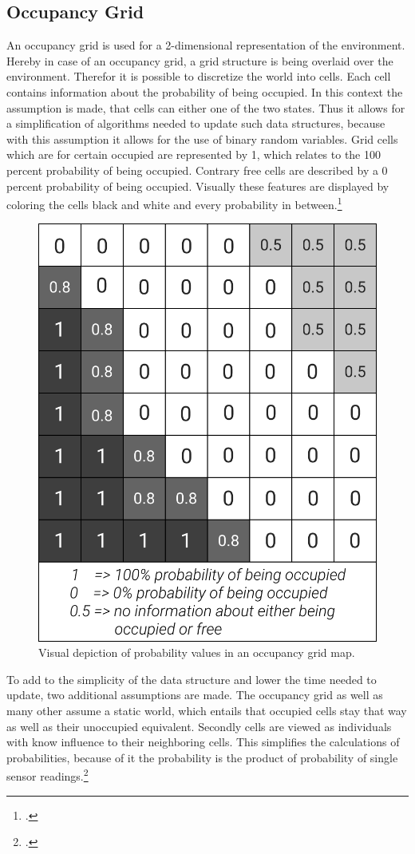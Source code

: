 \subsection{Occupancy Grid}
An occupancy grid is used for a 2-dimensional representation of the environment. Hereby in case of an occupancy grid, a grid structure is being overlaid over the environment. Therefor it is possible to discretize the world into cells. Each cell contains information about the probability of being occupied. In this context the assumption is made, that cells can either one of the two states. Thus it allows for a simplification of algorithms needed to update such data structures, because with this assumption it allows for the use of binary random variables. Grid cells which are for certain occupied are represented by 1, which relates to the 100 percent probability of being occupied. Contrary free cells are described by a 0 percent probability of being occupied. Visually these features are displayed by coloring the cells black and white and every probability in between.\footcite{uni-freiburgOccupancyGridMaps2020}

\begin{figure}[h]
	\centering
	\includegraphics[width=0.5\linewidth]{img/OccupancyGridCells}
	\caption{Visual depiction of probability values in an occupancy grid map.}
	\label{fig:abstract_environments_occupancyCells}
\end{figure}

To add to the simplicity of the data structure and lower the time needed to update, two additional assumptions are made. The occupancy grid as well as many other assume a static world, which entails that occupied cells stay that way as well as their unoccupied equivalent. Secondly cells are viewed as individuals with know influence to their neighboring cells. This simplifies the calculations of probabilities, because of it the probability is the product of probability of single sensor readings.\footcite{uni-freiburgOccupancyGridMaps2020}

